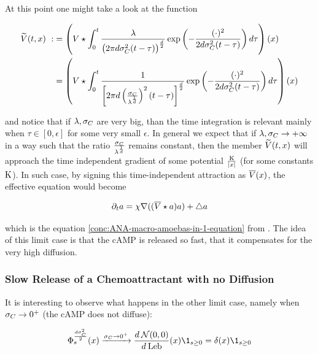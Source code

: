 At this point one might take a look at the function

\begin{align*}
	\widetilde{V}(t, x)\
	:&=
		\left(
		V \star 
		\int_0^t
		\frac{\lambda}{
			\big( 2\pi d\sigma_C^2 (t-\tau) \big)^{\frac{d}{2}}
		}
		\exp \left(
		-\frac{(\cdot)^2}{2 d\sigma_C^2 (t-\tau)}
		\right)
		d \tau
		\right) (x)
	\\
	&=
		\left(
		V \star 
		\int_0^t
		\frac{1}{
			\left[ 2\pi d
				\left(
					\frac{\sigma_C}{\lambda^\frac{1}{d}}
				\right)^2 (t-\tau)
			\right]^{\frac{d}{2}}
		}
		\exp \left(
		-\frac{(\cdot)^2}{2 d\sigma_C^2 (t-\tau)}
		\right)
		d \tau
		\right) (x)
\end{align*}

and notice that if $\lambda, \sigma_C$ are very big, than the time integration is relevant mainly when $\tau \in [0,\epsilon]$ for some very small $\epsilon$.
In general we expect that if $\lambda, \sigma_C \rightarrow +\infty$ in a way such that the ratio $\frac{\sigma_C}{\lambda^\frac{1}{d}}$ remains constant, then the member $\widetilde{V}(t, x)$ will approach the time independent gradient of some potential $\frac{\text{K}}{\left| x \right|}$ (for some constants $\text{K}$).
In such case, by signing this time-independent attraction as $\overline{V} (x)$, the effective equation would become

\begin{equation}
	\partial_t a = \chi \nabla ( (\overline{V} \star a) a) + \bigtriangleup a
\end{equation}

which is the equation \ref{conc:ANA-macro-amoebas-in-1-equation} from \cite{ana}.
The idea of this limit case is that the cAMP is released so fast, that it compensates for the very high diffusion.

\subsubsection{Slow Release of a Chemoattractant with no Diffusion}

It is interesting to observe what happens in the other limit case, namely when $\sigma_C\rightarrow0^+$ (\ie the cAMP does not diffuse):

\begin{equation*}
	\heatkernel_s^{\frac{d\sigma_\camp^2}{2}}(x)
	\xrightarrow{\diffusion_\camp \rightarrow 0^+}
	\frac{d\: \Normal(0, 0)}{d\:\lebsge} (x)
	\1_{s\geq 0} 
	=
	\delta(x) \1_{s\geq 0}
\end{equation*}

